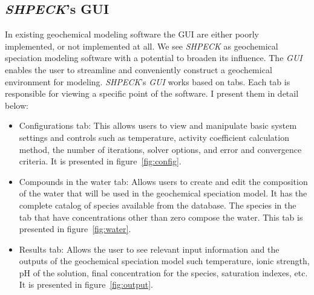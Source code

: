 \subsection{\emph{SHPECK}'s GUI }
In existing geochemical modeling software the GUI are either poorly implemented, or not implemented at all. We see \emph{SHPECK} as geochemical speciation modeling software with a potential to broaden its influence. The \emph{GUI} enables the user to streamline and conveniently construct a geochemical environment for modeling.
\emph{SHPECK}'s \emph{GUI} works based on tabs. Each tab is responsible for viewing a specific point of the software. I present them in detail below:
\begin{itemize}
\item Configurations tab: This allows users to view and manipulate basic system settings and controls such as temperature, activity coefficient calculation method, the number of iterations, solver options, and error and convergence criteria. It is presented in figure~\ref{fig:config}.
\item Compounds in the water tab: Allows users to create and edit the composition of the water that will be used in the geochemical speciation model. It has the complete catalog of species available from the database. The species in the tab that have concentrations other than zero compose the water. This tab is presented in figure~\ref{fig:water}.
\item Results tab: Allows the user to see relevant input information and the outputs of the geochemical speciation model such temperature, ionic strength, pH of the solution, final concentration for the species, saturation indexes, etc. It is presented in figure~\ref{fig:output}.
\end{itemize}


